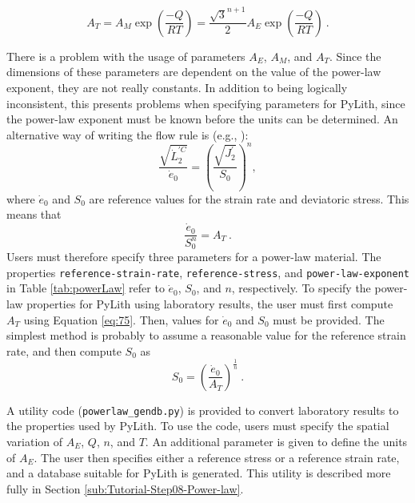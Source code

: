 \begin{equation}
A_{T}=A_{M}\exp\left(\frac{-Q}{RT}\right)=\frac{\sqrt{3}^{n+1}}{2}A_{E}\exp\left(\frac{-Q}{RT}\right)\:.\label{eq:75}
\end{equation}


There is a problem with the usage of parameters $A_{E}$, $A_{M}$,
and $A_{T}$. Since the dimensions of these parameters are dependent
on the value of the power-law exponent, they are not really constants.
In addition to being logically inconsistent, this presents problems
when specifying parameters for PyLith, since the power-law exponent
must be known before the units can be determined. An alternative way
of writing the flow rule is (e.g., \cite{Prentice:1968}): 
\begin{equation}
\frac{\sqrt{\dot{L}_{2}^{\prime C}}}{\dot{e}_{0}}=\left(\frac{\sqrt{J_{2}^{\prime}}}{S_{0}}\right)^{n},\label{eq:76}
\end{equation}
where $\dot{e}_{0}$ and $S_{0}$ are reference values for the strain
rate and deviatoric stress. This means that
\begin{equation}
\frac{\dot{e}_{0}}{S_{0}^{n}}=A_{T}\:.\label{eq:77}
\end{equation}
Users must therefore specify three parameters for a power-law material.
The properties \texttt{reference-strain-rate}, \texttt{reference-stress},
and \texttt{power-law-exponent} in Table \ref{tab:powerLaw} refer
to $\dot{e}_{0}$, $S_{0}$, and $n$, respectively. To specify the
power-law properties for PyLith using laboratory results, the user
must first compute $A_{T}$ using Equation \ref{eq:75}. Then, values
for $\dot{e}_{0}$ and $S_{0}$ must be provided. The simplest method
is probably to assume a reasonable value for the reference strain
rate, and then compute $S_{0}$ as
\begin{equation}
S_{0}=\left(\frac{\dot{e}_{0}}{A_{T}}\right)^{\frac{1}{n}}\:.\label{eq:78}
\end{equation}


A utility code (\texttt{powerlaw\_gendb.py}) is provided to convert
laboratory results to the properties used by PyLith. To use the code,
users must specify the spatial variation of $A_{E}$, $Q$, $n$,
and $T$. An additional parameter is given to define the units of
$A_{E}$. The user then specifies either a reference stress or a reference
strain rate, and a database suitable for PyLith is generated. This
utility is described more fully in Section \ref{sub:Tutorial-Step08-Power-law}.

